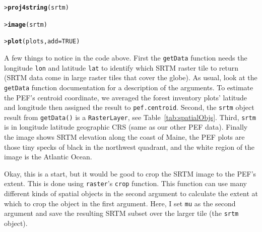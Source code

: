 \documentclass[12pt,oneside]{book}\usepackage[]{graphicx}\usepackage[]{color}
\makeatletter
\newcommand{\hlnum}[1]{\textcolor[rgb]{0.686,0.059,0.569}{#1}}%
\newcommand{\hlstd}[1]{\textcolor[rgb]{0.345,0.345,0.345}{#1}}%
\newcommand{\hlkwc}[1]{\textcolor[rgb]{0.333,0.667,0.333}{#1}}%
\newcommand{\hlkwd}[1]{\textcolor[rgb]{0.737,0.353,0.396}{\textbf{#1}}}%
\newenvironment{kframe}{%
 \def\at@end@of@kframe{}%
 \ifinner\ifhmode%
  \def\at@end@of@kframe{\end{minipage}}%
  \begin{minipage}{\columnwidth}%
 \fi\fi%
 \def\FrameCommand##1{\hskip\@totalleftmargin \hskip-\fboxsep
 \colorbox{shadecolor}{##1}\hskip-\fboxsep
     \hskip-\linewidth \hskip-\@totalleftmargin \hskip\columnwidth}%
 \MakeFramed {\advance\hsize-\width
   \@totalleftmargin\z@ \linewidth\hsize
   \@setminipage}}%
 {\par\unskip\endMakeFramed%
 \at@end@of@kframe}
\newenvironment{knitrout}{}{} %
\makeatother
\begin{document}
\begin{knitrout}
\begin{kframe}
{\ttfamily\noindent\bfseries\color{errorcolor}{Error in eval(expr, envir, enclos): object 'srtm' not found}}\begin{alltt}
\hlstd{> }\hlkwd{proj4string}\hlstd{(srtm)}
\end{alltt}


{\ttfamily\noindent\bfseries\color{errorcolor}{Error in proj4string(srtm): object 'srtm' not found}}\begin{alltt}
\hlstd{> }\hlkwd{image}\hlstd{(srtm)}
\end{alltt}


{\ttfamily\noindent\bfseries\color{errorcolor}{Error in image(srtm): object 'srtm' not found}}\begin{alltt}
\hlstd{> }\hlkwd{plot}\hlstd{(plots,} \hlkwc{add} \hlstd{=} \hlnum{TRUE}\hlstd{)}
\end{alltt}


{\ttfamily\noindent\bfseries\color{errorcolor}{Error in plot.xy(xy.coords(x, y), type = type, ...): plot.new has not been called yet}}\end{kframe}
\end{knitrout}

A few things to notice in the code above. First the \verb+getData+ function needs the longitude \verb+lon+ and latitude \verb+lat+ to identify which SRTM raster tile to return (SRTM data come in large raster tiles that cover the globe). As usual, look at the \verb+getData+ function documentation for a description of the arguments. To estimate the PEF's centroid coordinate, we averaged the forest inventory plots' latitude and longitude then assigned the result to \verb+pef.centroid+. Second, the \verb+srtm+ object result from \verb+getData()+ is a \verb+RasterLayer+, see Table~\ref{tab:spatialObjs}. Third, \verb+srtm+ is in longitude latitude geographic CRS (same as our other PEF data). Finally the image shows SRTM elevation along the coast of Maine, the PEF plots are those tiny specks of black in the northwest quadrant, and the white region of the image is the Atlantic Ocean. 

Okay, this is a start, but it would be good to crop the SRTM image to the PEF's extent. This is done using \verb+raster+'s \verb+crop+ function. This function can use many different kinds of spatial objects in the second argument to calculate the extent at which to crop the object in the first argument. Here, I set \verb+mu+ as the second argument and save the resulting SRTM subset over the larger tile (the \verb+srtm+ object).
\end{document}
